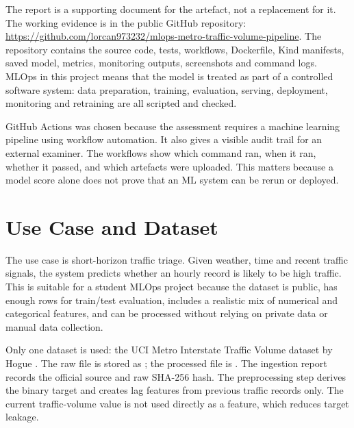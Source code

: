 \documentclass[journal,twoside,web]{ieeecolor}
\begin{document}
The report is a supporting document for the artefact, not a replacement for it. The working evidence is in the public GitHub repository: \url{https://github.com/lorcan973232/mlops-metro-traffic-volume-pipeline}. The repository contains the source code, tests, workflows, Dockerfile, Kind manifests, saved model, metrics, monitoring outputs, screenshots and command logs. MLOps in this project means that the model is treated as part of a controlled software system: data preparation, training, evaluation, serving, deployment, monitoring and retraining are all scripted and checked.

GitHub Actions was chosen because the assessment requires a machine learning pipeline using workflow automation. It also gives a visible audit trail for an external examiner. The workflows show which command ran, when it ran, whether it passed, and which artefacts were uploaded. This matters because a model score alone does not prove that an ML system can be rerun or deployed.

\section{Use Case and Dataset}
The use case is short-horizon traffic triage. Given weather, time and recent traffic signals, the system predicts whether an hourly record is likely to be high traffic. This is suitable for a student MLOps project because the dataset is public, has enough rows for train/test evaluation, includes a realistic mix of numerical and categorical features, and can be processed without relying on private data or manual data collection.

Only one dataset is used: the UCI Metro Interstate Traffic Volume dataset by Hogue \cite{uci}. The raw file is stored as ; the processed file is . The ingestion report records the official source and raw SHA-256 hash. The preprocessing step derives the binary target and creates lag features from previous traffic records only. The current traffic-volume value is not used directly as a feature, which reduces target leakage.
\end{document}
